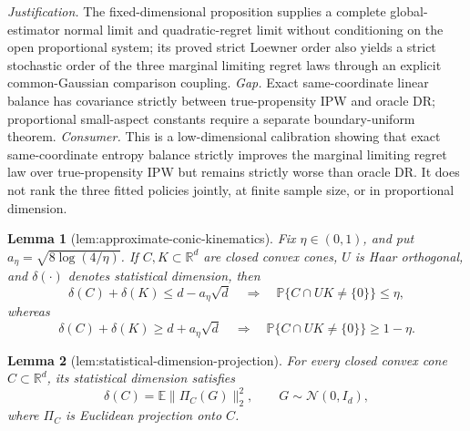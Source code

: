 \documentclass{article}
\newtheorem{lemma}{Lemma}
\begin{document}
\par\smallskip\noindent \textit{Justification.} The fixed-dimensional proposition supplies a complete global-estimator normal limit and quadratic-regret limit without conditioning on the open proportional system; its proved strict Loewner order also yields a strict stochastic order of the three marginal limiting regret laws through an explicit common-Gaussian comparison coupling. \textit{Gap.} Exact same-coordinate linear balance has covariance strictly between true-propensity IPW and oracle DR; proportional small-aspect constants require a separate boundary-uniform theorem. \textit{Consumer.} This is a low-dimensional calibration showing that exact same-coordinate entropy balance strictly improves the marginal limiting regret law over true-propensity IPW but remains strictly worse than oracle DR. It does not rank the three fitted policies jointly, at finite sample size, or in proportional dimension.

\begin{lemma}[lem:approximate-conic-kinematics]\label{lem:approximate-conic-kinematics}
Fix \(\eta\in(0,1)\), and put \(a_\eta=\sqrt{8\log(4/\eta)}\).  If \(C,K\subset\mathbb R^d\) are closed convex cones, \(U\) is Haar orthogonal, and \(\delta(\cdot)\) denotes statistical dimension, then
\[
 \delta(C)+\delta(K)\le d-a_\eta\sqrt d
 \quad\Longrightarrow\quad
 \mathbb P\{C\cap UK\ne\{0\}\}\le\eta,
\]
whereas
\[
 \delta(C)+\delta(K)\ge d+a_\eta\sqrt d
 \quad\Longrightarrow\quad
 \mathbb P\{C\cap UK\ne\{0\}\}\ge1-\eta.
\]
\end{lemma}

\begin{lemma}[lem:statistical-dimension-projection]\label{lem:statistical-dimension-projection}
For every closed convex cone \(C\subset\mathbb R^d\), its statistical dimension satisfies
\[
 \delta(C)=\mathbb E\|\Pi_C(G)\|_2^2,
 \qquad G\sim\mathcal N(0,I_d),
\]
where \(\Pi_C\) is Euclidean projection onto \(C\).
\end{lemma}
\end{document}
